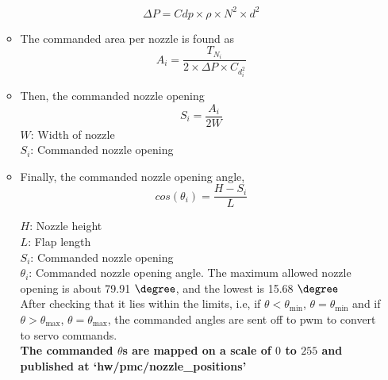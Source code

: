 \documentclass{article}
\begin{document}
\begin{itemize}
\begin{itemize}
    \begin{equation}
\Delta P = Cdp\times \rho \times N^2 \times d^2
\end{equation} 


\item The commanded area per nozzle is found as
\begin{equation}
A_i = \frac{T_N_i}{2\times\Delta P \times C_d_i^2}
\end{equation}
\item Then, the commanded nozzle opening
\begin{equation}
S_i = \frac{A_i}{2W}
\end{equation}
$W$: Width of nozzle\\
$S_i$: Commanded nozzle opening\\

\item  Finally, the commanded nozzle opening angle,  
\begin{equation}
cos(\theta_i) = \frac{H - S_i}{L}
\end{equation}

$H$: Nozzle height\\
$L$: Flap length\\
$S_i$: Commanded nozzle opening\\
$\theta_i$: Commanded nozzle opening angle. The maximum allowed nozzle opening is about 79.91 $\degree$, and the lowest is 15.68 $\degree$\\
After checking that it lies within the limits, i.e, if $\theta<\theta_{\textrm{min}}$, $\theta = \theta_{\textrm{min}}$ and if $\theta>\theta_{\textrm{max}}$, $\theta = \theta_{\textrm{max}}$, the commanded angles are sent off to pwm to convert to servo commands.\\
\textbf{The commanded $\theta$s are mapped on a scale of $0$ to $255$ and published at `hw/pmc/nozzle\_positions'}
\end{itemize}
\smallskip




\end{itemize}
\end{document}
